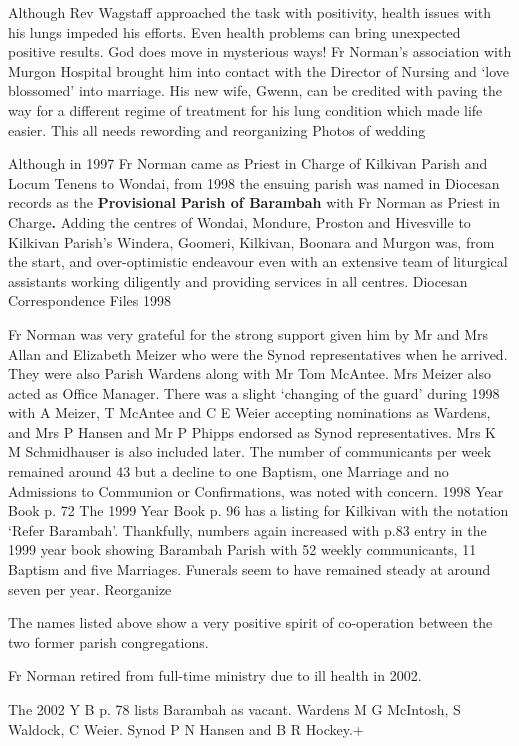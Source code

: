 Although Rev Wagstaff approached the task with positivity, health issues
with his lungs impeded his efforts. Even health problems can bring
unexpected positive results. God does move in mysterious ways! Fr
Norman's association with Murgon Hospital brought him into contact with
the Director of Nursing and `love blossomed' into marriage. His new
wife, Gwenn, can be credited with paving the way for a different regime
of treatment for his lung condition which made life easier. This all
needs rewording and reorganizing Photos of wedding

Although in 1997 Fr Norman came as Priest in Charge of Kilkivan Parish
and Locum Tenens to Wondai, from 1998 the ensuing parish was named in
Diocesan records as the \textbf{Provisional} \textbf{Parish of Barambah}
with Fr Norman as Priest in Charge\textbf{.} Adding the centres of
Wondai, Mondure, Proston and Hivesville to Kilkivan Parish's Windera,
Goomeri, Kilkivan, Boonara and Murgon was, from the start, and
over-optimistic endeavour even with an extensive team of liturgical
assistants working diligently and providing services in all centres.
Diocesan Correspondence Files 1998

Fr Norman was very grateful for the strong support given him by Mr and
Mrs Allan and Elizabeth Meizer who were the Synod representatives when
he arrived. They were also Parish Wardens along with Mr Tom McAntee. Mrs
Meizer also acted as Office Manager. There was a slight `changing of the
guard' during 1998 with A Meizer, T McAntee and C E Weier accepting
nominations as Wardens, and Mrs P Hansen and Mr P Phipps endorsed as
Synod representatives. Mrs K M Schmidhauser is also included later. The
number of communicants per week remained around 43 but a decline to one
Baptism, one Marriage and no Admissions to Communion or Confirmations,
was noted with concern. 1998 Year Book p. 72 The 1999 Year Book p. 96
has a listing for Kilkivan with the notation `Refer Barambah'.
Thankfully, numbers again increased with p.83 entry in the 1999 year
book showing Barambah Parish with 52 weekly communicants, 11 Baptism and
five Marriages. Funerals seem to have remained steady at around seven
per year. Reorganize

The names listed above show a very positive spirit of co-operation
between the two former parish congregations.

Fr Norman retired from full-time ministry due to ill health in 2002.

The 2002 Y B p. 78 lists Barambah as vacant. Wardens M G McIntosh, S
Waldock, C Weier. Synod P N Hansen and B R Hockey.+

